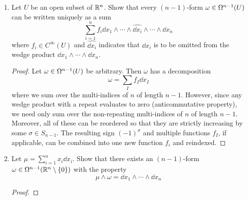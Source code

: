 \documentclass[../psets.tex]{subfiles}
\begin{document}
\begin{enumerate}[label={\textbf{2.3.\roman*.}}]
\begin{proof}
        \begin{equation*}
            \dd{f_1}\wedge\cdots\wedge\dd{f_n} = \sum_{\sigma\in S_n}\pdv{f_1}{x_{\sigma(1)}}\cdots\pdv{f_n}{x_{\sigma(n)}}\dd x_{\sigma(1)}\wedge\cdots\wedge\dd x_{\sigma(n)}
        \end{equation*}
        But by an extension of Claim 1.6.8,
        \begin{equation*}
            \dd x_{\sigma(1)}\wedge\cdots\wedge\dd x_{\sigma(n)} = (-1)^\sigma\dd x_1\wedge\cdots\wedge\dd x_n
        \end{equation*}
        Therefore, we can factor out the one-form from the sum and equate the sum with the determinant, as desired.
        \begin{align*}
            \dd{f_1}\wedge\cdots\wedge\dd{f_n} &= \left[ \sum_{\sigma\in S_n}(-1)^\sigma\pdv{f_1}{x_{\sigma(1)}}\cdots\pdv{f_n}{x_{\sigma(n)}} \right]\dd x_1\wedge\cdots\wedge\dd x_n\\
            &= \det\left[ \pdv{f_i}{x_j} \right]\dd{x_1}\wedge\cdots\wedge\dd{x_n}
        \end{align*}
    \end{proof}
    \item Let $U$ be an open subset of $\R^n$. Show that every $(n-1)$-form $\omega\in\ome[n-1]{U}$ can be written uniquely as a sum
    \begin{equation*}
        \sum_{i=1}^nf_i\dd{x_1}\wedge\cdots\wedge\widehat{\dd{x_i}}\wedge\cdots\wedge\dd{x_n}
    \end{equation*}
    where $f_i\in C^\infty(U)$ and $\widehat{\dd{x_i}}$ indicates that $\dd{x_i}$ is to be omitted from the wedge product $\dd{x_1}\wedge\cdots\wedge\dd{x_n}$.
    \begin{proof}
        Let $\omega\in\ome[n-1]{U}$ be arbitrary. Then $\omega$ has a decomposition
        \begin{equation*}
            \omega = \sum_If_I\dd{x_I}
        \end{equation*}
        where we sum over the multi-indices of $n$ of length $n-1$. However, since any wedge product with a repeat evaluates to zero (anticommutative property), we need only sum over the non-repeating multi-indices of $n$ of length $n-1$. Moreover, all of these can be reordered so that they are strictly increasing by some $\sigma\in S_{n-1}$. The resulting sign $(-1)^\sigma$ and multiple functions $f_I$, if applicable, can be combined into one new function $f_i$ and reindexed.
    \end{proof}
    \item Let $\mu=\sum_{i=1}^nx_i\dd{x_i}$. Show that there exists an $(n-1)$-form $\omega\in\ome[n-1]{\R^n\setminus\{0\}}$ with the property
    \begin{equation*}
        \mu\wedge\omega = \dd{x_1}\wedge\cdots\wedge\dd{x_n}
    \end{equation*}
    \begin{proof}


\end{proof}
\end{enumerate}
\end{document}
